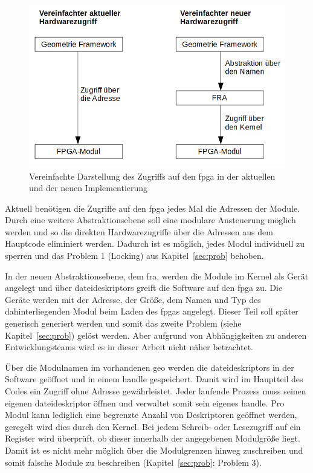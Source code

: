 \begin{figure}[!hbtp]
	\centering
	\includegraphics[width = 0.9\linewidth]{pictures/2019-11-17_ImplementierungNewvsOld.png}
	\smallskip
	\caption{Vereinfachte Darstellung des Zugriffs auf den \ac{fpga} in der aktuellen und der neuen Implementierung}
	\label{fig:newvsold}
\end{figure} 



Aktuell benötigen die Zugriffe auf den \ac{fpga} jedes Mal die Adressen der Module. Durch eine weitere Abstraktionsebene soll eine modulare Ansteuerung möglich werden und so die direkten Hardwarezugriffe über die Adressen aus dem Hauptcode eliminiert werden. Dadurch ist es möglich, jedes Modul individuell zu sperren und das Problem 1 (Locking) aus Kapitel~\ref{sec:prob} behoben.


In der neuen Abstraktionsebene, dem \ac{fra}, werden die Module im Kernel als Gerät angelegt und über \glspl{dateideskriptor} greift die Software auf den \ac{fpga} zu. Die Geräte werden mit der Adresse, der Größe, dem Namen und Typ des dahinterliegenden Modul beim Laden des \ac{fpga}s angelegt. Dieser Teil soll später generisch generiert werden und somit das zweite Problem (siehe Kapitel~\ref{sec:prob}) gelöst werden. Aber aufgrund von Abhängigkeiten zu anderen Entwicklungsteams wird es in dieser Arbeit nicht näher betrachtet.



Über die Modulnamen im vorhandenen \ac{geo} werden die \glspl{dateideskriptor} in der Software geöffnet und in einem \gls{handle} gespeichert. Damit wird im Hauptteil des Codes ein Zugriff ohne Adresse gewährleistet. Jeder laufende Prozess muss seinen eigenen \gls{dateideskriptor} öffnen und verwaltet somit sein eigenes \gls{handle}. Pro Modul kann lediglich eine begrenzte Anzahl von Deskriptoren geöffnet werden, geregelt wird dies durch den Kernel. 
Bei jedem Schreib- oder Lesezugriff auf ein Register wird überprüft, ob dieser innerhalb der angegebenen Modulgröße liegt. Damit ist es nicht mehr möglich über die Modulgrenzen hinweg zuschreiben und somit falsche Module zu beschreiben (Kapitel~\ref{sec:prob}: Problem 3).




